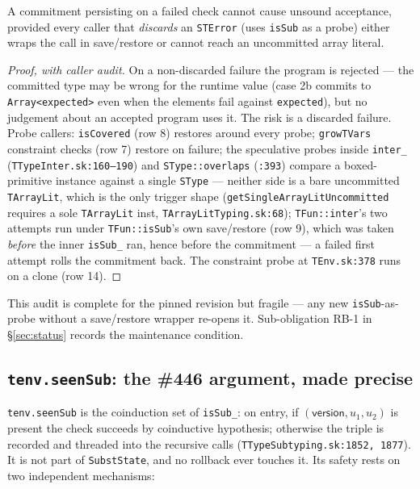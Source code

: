 \documentclass[11pt]{article}
\begin{document}
\begin{lemma}
\label{lem:arraylit-carveout}
A commitment persisting on a failed check cannot cause unsound
acceptance, provided every caller that \emph{discards} an
\texttt{STError} (uses \texttt{isSub} as a probe) either wraps the call
in save/restore or cannot reach an uncommitted array literal.
\end{lemma}
\begin{proof}[Proof, with caller audit]
On a non-discarded failure the program is rejected — the committed type
may be wrong for the runtime value (case 2b commits to
\texttt{Array<expected>} even when the elements fail against
\texttt{expected}), but no judgement about an accepted program uses it.
The risk is a discarded failure. Probe callers: \texttt{isCovered}
(row 8) restores around every probe; \texttt{growTVars} constraint checks
(row 7) restore on failure; the speculative probes inside
\texttt{inter\_} (\texttt{TTypeInter.sk:160--190}) and
\texttt{SType::overlaps} (\texttt{:393}) compare a boxed-primitive
instance against a single \texttt{SType} — neither side is a bare
uncommitted \texttt{TArrayLit}, which is the only trigger shape
(\texttt{getSingleArrayLitUncommitted} requires a sole
\texttt{TArrayLit} inst, \texttt{TArrayLitTyping.sk:68});
\texttt{TFun::inter}'s two attempts run under \texttt{TFun::isSub}'s own
save/restore (row 9), which was taken \emph{before} the inner
\texttt{isSub\_} ran, hence before the commitment — a failed first
attempt rolls the commitment back. The constraint probe at
\texttt{TEnv.sk:378} runs on a clone (row 14).
\end{proof}

This audit is complete for the pinned revision but fragile — any new
\texttt{isSub}-as-probe without a save/restore wrapper re-opens it.
Sub-obligation RB-1 in \S\ref{sec:status} records the maintenance
condition.

\subsection{\texttt{tenv.seenSub}: the \#446 argument, made precise}
\label{sec:tenv-seensub}

\texttt{tenv.seenSub} is the coinduction set of \texttt{isSub\_}: on
entry, if $(\mathsf{version}, u_1, u_2)$ is present the check succeeds by
coinductive hypothesis; otherwise the triple is recorded and threaded
into the recursive calls (\texttt{TTypeSubtyping.sk:1852, 1877}). It is
not part of \texttt{SubstState}, and no rollback ever touches it. Its
safety rests on two independent mechanisms:
\end{document}
